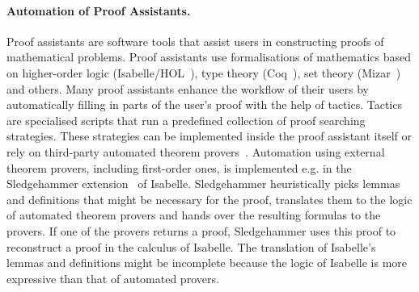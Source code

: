 \paragraph{Automation of Proof Assistants.}
Proof assistants are software tools that assist users in constructing proofs of mathematical problems. Proof assistants use formalisations of mathematics based on higher-order logic (Isabelle/HOL~\cite{Isabelle}), type theory (Coq~\cite{Coq}), set theory (Mizar~\cite{Mizar}) and others. Many proof assistants enhance the workflow of their users by automatically filling in parts of the user's proof with the help of tactics. Tactics are specialised scripts that run a predefined collection of proof searching strategies. These strategies can be implemented inside the proof assistant itself or rely on third-party automated theorem provers~\cite{Sledgehammer,DBLP:conf/icms/UrbanHV10}. Automation using external theorem provers, including first-order ones, is implemented e.g. in the Sledgehammer extension~\cite{Sledgehammer} of Isabelle. Sledgehammer heuristically picks lemmas and definitions that might be necessary for the proof, translates them to the logic of automated theorem provers and hands over the resulting formulas to the provers. If one of the provers returns a proof, Sledgehammer uses this proof to reconstruct a proof in the calculus of Isabelle. The translation of Isabelle's lemmas and definitions might be incomplete because the logic of Isabelle is more expressive than that of automated provers.

